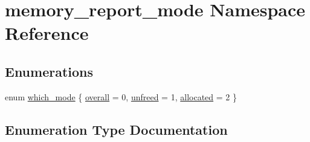 \hypertarget{namespacememory__report__mode}{}\section{memory\+\_\+report\+\_\+mode Namespace Reference}
\label{namespacememory__report__mode}
\subsection*{Enumerations}
\begin{DoxyCompactItemize}
\item 
enum \hyperlink{namespacememory__report__mode_a7a376e3e2cdf985fc8a6d33aa68c6f44}{which\+\_\+mode} \{ \hyperlink{namespacememory__report__mode_a7a376e3e2cdf985fc8a6d33aa68c6f44ad83a77b03c3bc103e7585e216d48d7cb}{overall} = 0, 
\hyperlink{namespacememory__report__mode_a7a376e3e2cdf985fc8a6d33aa68c6f44aa200e26c11a01b0ef2da4b852a1ee4b8}{unfreed} = 1, 
\hyperlink{namespacememory__report__mode_a7a376e3e2cdf985fc8a6d33aa68c6f44a934cc59d6c86c4090c1a2e61af7428d4}{allocated} = 2
 \}
\end{DoxyCompactItemize}


\subsection{Enumeration Type Documentation}
